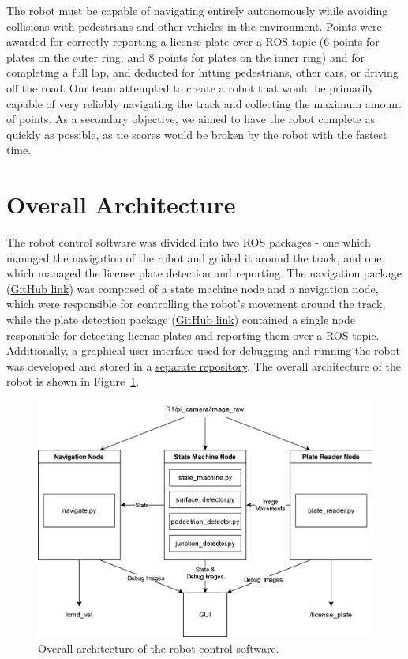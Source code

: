 \documentclass[titlepage, twocolumn]{article}
\begin{document}
    The robot must be capable of navigating entirely autonomously while avoiding collisions with pedestrians and other vehicles in the environment. Points were awarded for correctly reporting a license plate over a ROS topic (6 points for plates on the outer ring, and 8 points for plates on the inner ring) and for completing a full lap, and deducted for hitting pedestrians, other cars, or driving off the road. Our team attempted to create a robot that would be primarily capable of very reliably navigating the track and collecting the maximum amount of points. As a secondary objective, we aimed to have the robot complete as quickly as possible, as tie scores would be broken by the robot with the fastest time.

\section{Overall Architecture}

    The robot control software was divided into two ROS packages - one which managed the navigation of the robot and guided it around the track, and one which managed the license plate detection and reporting. The navigation package (\href{https://github.com/Esouder/competition_controller}{GitHub link}) was composed of a state machine node and a navigation node, which were responsible for controlling the robot's movement around the track, while the plate detection package (\href{https://github.com/nvanrumpt/353_plate_reader}{GitHub link}) contained a single node responsible for detecting license plates and reporting them over a ROS topic. Additionally, a graphical user interface used for debugging and running the robot was developed and stored in a \href{https://github.com/nvanrumpt/353RobotCompetitionGUI}{separate repository}. The overall architecture of the robot is shown in Figure~\ref{fig:architecture}. 

    \begin{figure}
        \centering
        \includegraphics[width=0.8\linewidth]{architecture.png}
        \caption{Overall architecture of the robot control software.}
        \label{fig:architecture}
    \end{figure}
\end{document}
